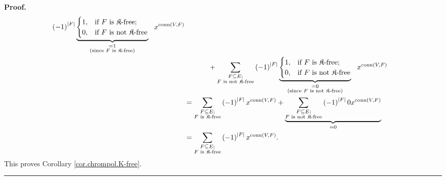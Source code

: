 \documentclass[numbers=enddot,12pt,final,onecolumn,notitlepage]{scrartcl}%
\theoremstyle{definition}
\newenvironment{proof}[1][Proof]{\noindent\textbf{#1.} }{\ \rule{0.5em}{0.5em}}
\newenvironment{verlong}{}{}
\let\sumnonlimits\sum
\renewcommand{\sum}{\sumnonlimits\limits}
\begin{document}
\begin{verlong}
\begin{proof}
\begin{align*}
{{}}\left(  -1\right)  ^{\left\vert F\right\vert }\underbrace{%
\begin{cases}
1, & \text{if }F\text{ is }\mathfrak{K}\text{-free;}\\
0, & \text{if }F\text{ is not }\mathfrak{K}\text{-free}%
\end{cases}
}_{\substack{=1\\\text{(since }F\text{ is }\mathfrak{K}\text{-free)}%
}}\ \ x^{\operatorname*{conn}\left(  V,F\right)  }\\
&  \ \ \ \ \ \ \ \ \ \ +\sum_{\substack{F\subseteq E;\\F\text{ is not
}\mathfrak{K}\text{-free}}}\left(  -1\right)  ^{\left\vert F\right\vert
}\underbrace{%
\begin{cases}
1, & \text{if }F\text{ is }\mathfrak{K}\text{-free;}\\
0, & \text{if }F\text{ is not }\mathfrak{K}\text{-free}%
\end{cases}
}_{\substack{=0\\\text{(since }F\text{ is not }\mathfrak{K}\text{-free)}%
}}\ \ x^{\operatorname*{conn}\left(  V,F\right)  }\\
&  =\sum_{\substack{F\subseteq E;\\F\text{ is }\mathfrak{K}\text{-free}%
}}\left(  -1\right)  ^{\left\vert F\right\vert }x^{\operatorname*{conn}\left(
V,F\right)  }+\underbrace{\sum_{\substack{F\subseteq E;\\F\text{ is not
}\mathfrak{K}\text{-free}}}\left(  -1\right)  ^{\left\vert F\right\vert
}0x^{\operatorname*{conn}\left(  V,F\right)  }}_{=0}\\
&  =\sum_{\substack{F\subseteq E;\\F\text{ is }\mathfrak{K}\text{-free}%
}}\left(  -1\right)  ^{\left\vert F\right\vert }x^{\operatorname*{conn}\left(
V,F\right)  }.
\end{align*}
This proves Corollary \ref{cor.chrompol.K-free}.
\end{proof}
\end{verlong}
\end{document}
